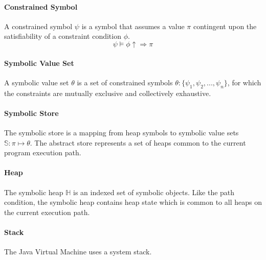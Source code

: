 \paragraph{Constrained Symbol}
A constrained symbol $\psi$ is a symbol that assumes a value $\pi$ contingent upon the satisfiability of a constraint condition $\phi$.
\begin{equation}
\psi\models \phi\uparrow \Rightarrow\pi
\end{equation}
\paragraph{Symbolic Value Set}
A symbolic value set $\theta$ is a set of constrained symbols $\theta\colon \{\psi _1,\psi _2,...,\psi _n\}$, for which the constraints are mutually exclusive and collectively exhaustive.
\paragraph{Symbolic Store}
The symbolic store is a mapping from heap symbols to symbolic value sets $\mathbb{S}\colon \pi \mapsto \theta$. The abstract store represents a set of heaps common to the current program execution path. 
\paragraph{Heap}
The symbolic heap $\mathbb{H}$ is an indexed set of symbolic objects. Like the path condition, the symbolic heap contains heap state which is common to all heaps on the current execution path. 
\paragraph{Stack}
The Java Virtual Machine uses a system stack.